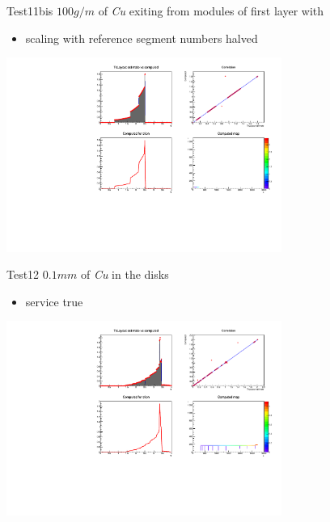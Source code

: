 \documentclass[pdftex, 11pt]{beamer}
\begin{document}
\begin{frame}
  \begin{block}{Test11bis}
    \alert{$100 g/m$} of \emph{Cu} exiting from modules of first layer with
    \begin{itemize}
    \item \alert{scaling} with reference \alert{segment numbers} halved
    \end{itemize}
  \end{block}
  \begin{center}
    \includegraphics[width=9cm]{img/test11bis.pdf}
  \end{center}
\end{frame}

\begin{frame}
  \begin{block}{Test12}
    \alert{$0.1 mm$} of \emph{Cu} in the disks
    \begin{itemize}
    \item \alert{service} true
    \end{itemize}
  \end{block}
  \begin{center}
    \includegraphics[width=9cm]{img/test12.pdf}
  \end{center}
\end{frame}
\end{document}
